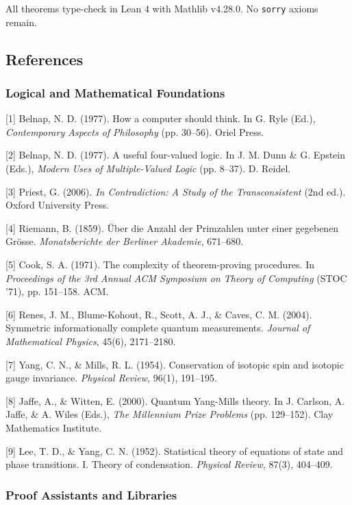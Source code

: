 \documentclass[10pt,a4paper]{article}
\begin{document}
All theorems type-check in Lean 4 with Mathlib v4.28.0. No \texttt{sorry} axioms remain.

\subsection{References}

\subsubsection{Logical and Mathematical Foundations}

{[}1{]} Belnap, N. D. (1977). How a computer should think. In G. Ryle (Ed.), \emph{Contemporary Aspects of Philosophy} (pp. 30--56). Oriel Press.

{[}2{]} Belnap, N. D. (1977). A useful four-valued logic. In J. M. Dunn \& G. Epstein (Eds.), \emph{Modern Uses of Multiple-Valued Logic} (pp. 8--37). D. Reidel.

{[}3{]} Priest, G. (2006). \emph{In Contradiction: A Study of the Transconsistent} (2nd ed.). Oxford University Press.

{[}4{]} Riemann, B. (1859). Über die Anzahl der Primzahlen unter einer gegebenen Grösse. \emph{Monatsberichte der Berliner Akademie}, 671--680.

{[}5{]} Cook, S. A. (1971). The complexity of theorem-proving procedures. In \emph{Proceedings of the 3rd Annual ACM Symposium on Theory of Computing} (STOC '71), pp. 151--158. ACM.

{[}6{]} Renes, J. M., Blume-Kohout, R., Scott, A. J., \& Caves, C. M. (2004). Symmetric informationally complete quantum measurements. \emph{Journal of Mathematical Physics}, 45(6), 2171--2180.

{[}7{]} Yang, C. N., \& Mills, R. L. (1954). Conservation of isotopic spin and isotopic gauge invariance. \emph{Physical Review}, 96(1), 191--195.

{[}8{]} Jaffe, A., \& Witten, E. (2000). Quantum Yang-Mills theory. In J. Carlson, A. Jaffe, \& A. Wiles (Eds.), \emph{The Millennium Prize Problems} (pp. 129--152). Clay Mathematics Institute.

{[}9{]} Lee, T. D., \& Yang, C. N. (1952). Statistical theory of equations of state and phase transitions. I. Theory of condensation. \emph{Physical Review}, 87(3), 404--409.

\subsubsection{Proof Assistants and Libraries}
\end{document}
